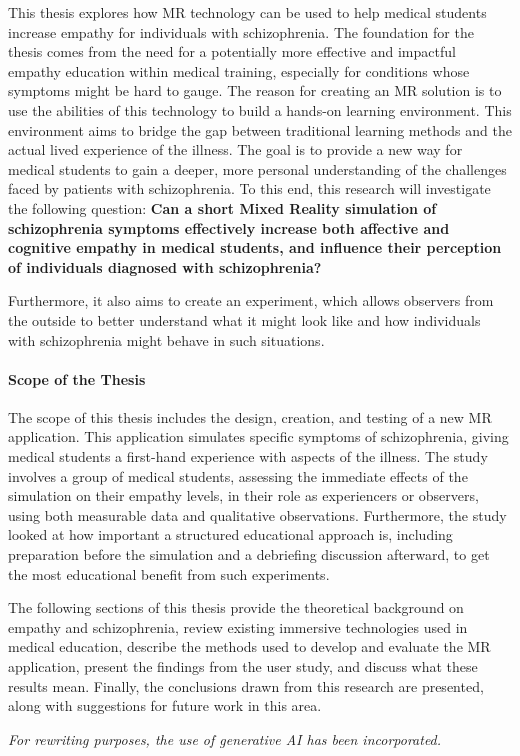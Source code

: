 \vspace{1em}

This thesis explores how MR technology can be used to help medical students increase empathy for individuals with schizophrenia. The foundation for the thesis comes from the need for a potentially more effective and impactful empathy education within medical training, especially for conditions whose symptoms might be hard to gauge. The reason for creating an MR solution is to use the abilities of this technology to build a hands-on learning environment. This environment aims to bridge the gap between traditional learning methods and the actual lived experience of the illness. The goal is to provide a new way for medical students to gain a deeper, more personal understanding of the challenges faced by patients with schizophrenia. To this end, this research will investigate the following question: \textbf{Can a short Mixed Reality simulation of schizophrenia symptoms effectively increase both affective and cognitive empathy in medical students, and influence their perception of individuals diagnosed with schizophrenia?}

Furthermore, it also aims to create an experiment, which allows observers from the outside to better understand what it might look like and how individuals with schizophrenia might behave in such situations.

\paragraph{Scope of the Thesis}

The scope of this thesis includes the design, creation, and testing of a new MR application. This application simulates specific symptoms of schizophrenia, giving medical students a first-hand experience with aspects of the illness. The study involves a group of medical students, assessing the immediate effects of the simulation on their empathy levels, in their role as experiencers or observers, using both measurable data and qualitative observations. Furthermore, the study looked at how important a structured educational approach is, including preparation before the simulation and a debriefing discussion afterward, to get the most educational benefit from such experiments. 

\vspace{1em}

The following sections of this thesis provide the theoretical background on empathy and schizophrenia, review existing immersive technologies used in medical education, describe the methods used to develop and evaluate the MR application, present the findings from the user study, and discuss what these results mean. Finally, the conclusions drawn from this research are presented, along with suggestions for future work in this area.

\bigskip
\noindent
\textit{For rewriting purposes, the use of generative AI has been incorporated.}